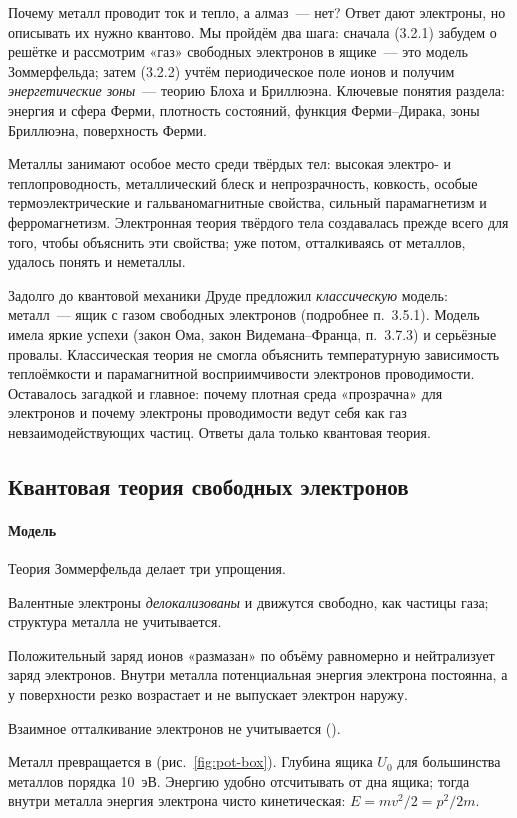 \begin{orientir}
Почему металл проводит ток и тепло, а алмаз~— нет? Ответ дают
электроны, но описывать их нужно квантово. Мы пройдём два шага:
сначала (3.2.1) забудем о решётке и рассмотрим «газ» свободных
электронов в ящике~— это модель Зоммерфельда; затем (3.2.2) учтём
периодическое поле ионов и получим \emph{энергетические зоны}~— теорию
Блоха и Бриллюэна. Ключевые понятия раздела: энергия и сфера Ферми,
плотность состояний, функция Ферми--Дирака, зоны Бриллюэна, поверхность
Ферми.
\end{orientir}

Металлы занимают особое место среди твёрдых тел: высокая электро- и
теплопроводность, металлический блеск и непрозрачность, ковкость,
особые термоэлектрические и гальваномагнитные свойства, сильный
парамагнетизм и ферромагнетизм. Электронная теория твёрдого тела
создавалась прежде всего для того, чтобы объяснить эти свойства; уже
потом, отталкиваясь от металлов, удалось понять и неметаллы.

Задолго до квантовой механики Друде предложил \emph{классическую}
модель: металл~— ящик с газом свободных электронов (подробнее
п.~3.5.1). Модель имела яркие успехи (закон Ома, закон Видемана--Франца,
п.~3.7.3) и серьёзные провалы. Классическая теория не смогла объяснить
температурную зависимость теплоёмкости и парамагнитной восприимчивости
электронов проводимости. Оставалось загадкой и главное: почему
плотная среда «прозрачна» для электронов и почему электроны проводимости
ведут себя как газ невзаимодействующих частиц. Ответы дала только
квантовая теория.

\subsection{Квантовая теория свободных электронов}\label{ssec:free-el}

\paragraph{Модель}
Теория Зоммерфельда делает три упрощения.
\begin{shagi}
\item Валентные электроны \emph{делокализованы} и движутся свободно, как
частицы газа; структура металла не учитывается.
\item Положительный заряд ионов «размазан» по объёму равномерно и
нейтрализует заряд электронов. Внутри металла потенциальная энергия
электрона постоянна, а у поверхности резко возрастает и не выпускает
электрон наружу.
\item Взаимное отталкивание электронов не учитывается ().
\end{shagi}
Металл превращается в  (рис.~\ref{fig:pot-box}).
Глубина ящика $U_0$ для большинства металлов порядка 10~эВ. Энергию
удобно отсчитывать от дна ящика; тогда внутри металла энергия электрона
чисто кинетическая: $E=mv^2/2=p^2/2m$.

